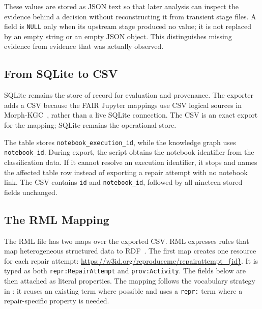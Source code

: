 These values are stored as JSON text so that later analysis can inspect the
evidence behind a decision without reconstructing it from transient stage
files. A field is \texttt{NULL} only when its upstream stage produced no
value; it is not replaced by an empty string or an empty JSON object. This
distinguishes missing evidence from evidence that was actually observed.

\subsection{From SQLite to CSV}
\label{sec:m-resultlogger-csv}

SQLite remains the store of record for evaluation and provenance. The
exporter adds a CSV because the FAIR Jupyter mappings use CSV logical
sources in Morph-KGC~\cite{arenas2024morphkgc}, rather than a live SQLite connection. The CSV is an
exact export for the mapping; SQLite remains the operational store.

The table stores \texttt{notebook\_execution\_id}, while the knowledge graph
uses \texttt{notebook\_id}. During export, the script obtains the notebook
identifier from the classification data. If it cannot resolve an execution
identifier, it stops and names the affected table row instead of exporting a
repair attempt with no notebook link. The CSV contains \texttt{id} and
\texttt{notebook\_id}, followed by all nineteen stored fields unchanged.

\subsection{The RML Mapping}
\label{sec:m-resultlogger-rml}

The RML file has two maps over the exported CSV. RML expresses rules that map
heterogeneous structured data to RDF~\cite{dimou2014rml}. The first map creates one
resource for each repair attempt:
\url{https://w3id.org/reproduceme/repairattempt_{id}}. It is typed as both
\texttt{repr:RepairAttempt} and \texttt{prov:Activity}. The fields below are
then attached as literal properties. The mapping follows the vocabulary
strategy in : it reuses an existing term where possible and
uses a \texttt{repr:} term where a repair-specific property is needed.

